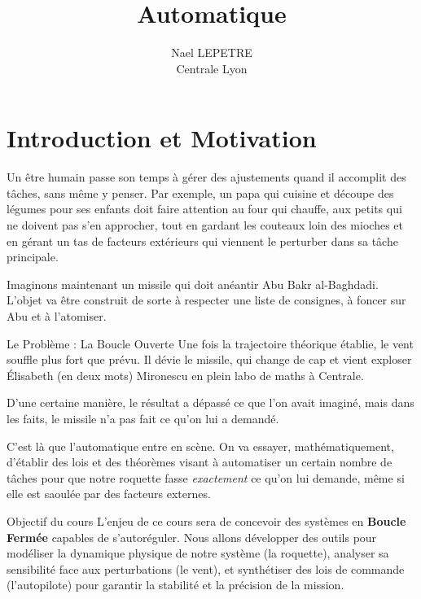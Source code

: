\documentclass[11pt,a4paper]{report}
\begin{document}
\title{\Huge\bfseries Automatique}
\author{\Large Nael LEPETRE \\ \small Centrale Lyon}
\date{\the\year}
\maketitle

\tableofcontents
\newpage

\chapter*{Introduction et Motivation}

Un être humain passe son temps à gérer des ajustements quand il accomplit des tâches, sans même y penser. Par exemple, un papa qui cuisine et découpe des légumes pour ses enfants doit faire attention au four qui chauffe, aux petits qui ne doivent pas s'en approcher, tout en gardant les couteaux loin des mioches et en gérant un tas de facteurs extérieurs qui viennent le perturber dans sa tâche principale. 

Imaginons maintenant un missile qui doit anéantir Abu Bakr al-Baghdadi. L'objet va être construit de sorte à respecter une liste de consignes, à foncer sur Abu et à l'atomiser. 

\begin{defbox}{Le Problème : La Boucle Ouverte}
    Une fois la trajectoire théorique établie, le vent souffle plus fort que prévu. Il dévie le missile, qui change de cap et vient exploser Élisabeth (en deux mots) Mironescu en plein labo de maths à Centrale. 
    
    D'une certaine manière, le résultat a dépassé ce que l'on avait imaginé, mais dans les faits, le missile n'a pas fait ce qu'on lui a demandé.
\end{defbox}

\vspace{0.5cm}

C'est là que l'automatique entre en scène. On va essayer, mathématiquement, d'établir des lois et des théorèmes visant à automatiser un certain nombre de tâches pour que notre roquette fasse \textit{exactement} ce qu'on lui demande, même si elle est saoulée par des facteurs externes.

\vspace{0.5cm}

\begin{importantbox}{Objectif du cours}
    L'enjeu de ce cours sera de concevoir des systèmes en \textbf{Boucle Fermée} capables de s'autoréguler. Nous allons développer des outils pour modéliser la dynamique physique de notre système (la roquette), analyser sa sensibilité face aux perturbations (le vent), et synthétiser des lois de commande (l'autopilote) pour garantir la stabilité et la précision de la mission.
\end{importantbox}
\end{document}
